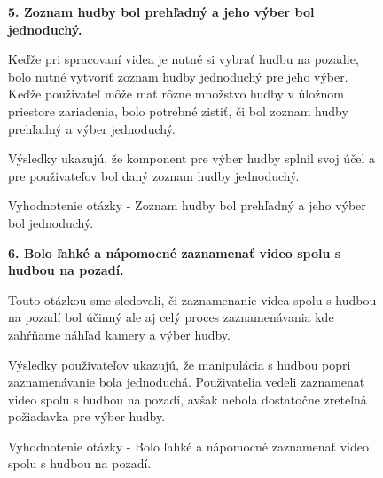 \begin{figure}[H]
\textbf{5. Zoznam hudby bol prehľadný
a jeho výber bol jednoduchý.}

Keďže pri spracovaní videa je nutné si vybrať hudbu na pozadie, bolo nutné vytvoriť zoznam hudby jednoduchý pre jeho výber. Keďže použivateľ môže mať rôzne množstvo hudby v úložnom priestore zariadenia, bolo potrebné zistiť, či bol zoznam hudby prehľadný a výber jednoduchý.

Výsledky ukazujú, že komponent pre výber hudby splnil svoj účel a pre použivateľov bol daný zoznam hudby jednoduchý.

\caption{Vyhodnotenie otázky - Zoznam hudby bol prehľadný
a jeho výber bol jednoduchý.}
\end{figure}


\begin{figure}[H]
\textbf{6. Bolo ľahké a nápomocné
zaznamenať video spolu s hudbou na pozadí.}

Touto otázkou sme sledovali, či zaznamenanie videa spolu s hudbou na pozadí bol účinný ale aj celý proces zaznamenávania kde zahŕňame náhľad kamery a výber hudby. 

Výsledky použivateľov ukazujú, že manipulácia s hudbou popri zaznamenávanie bola jednoduchá. Použivatelia vedeli zaznamenať video spolu s hudbou na pozadí, avšak nebola dostatočne zreteľná požiadavka pre výber hudby.

\caption{Vyhodnotenie otázky - Bolo ľahké a nápomocné
zaznamenať video spolu s hudbou na pozadí.}
\end{figure}


